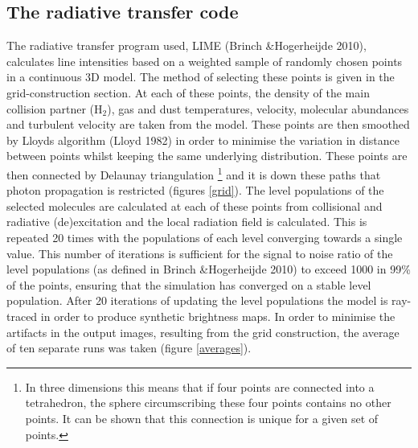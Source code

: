 \documentclass[useAMS,usenatbib]{mn2e}
\begin{document}
\subsection{The radiative transfer code} \label{subsec:radiative_transfer_code}
The radiative transfer program used, LIME (Brinch \&Hogerheijde 2010), calculates line intensities based on a weighted sample of randomly chosen points in a continuous 3D model. The method of selecting these points is given in the grid-construction section. At each of these points, the density of the main collision partner (H$_2$), gas and dust temperatures, velocity, molecular abundances and turbulent velocity are taken from the model. These points are then smoothed by Lloyds algorithm (Lloyd 1982) in order to minimise the variation in distance between points whilst keeping the same underlying distribution. These points are then connected by Delaunay triangulation \footnote{In three dimensions this means that if four points are connected into a tetrahedron, the sphere circumscribing these four points contains no other points. It can be shown that this connection is unique for a given set of points.} and it is down these paths that photon propagation is restricted (figures \ref{grid}). The level populations of the selected molecules are calculated at each of these points from collisional and radiative (de)excitation and the local radiation field is calculated. This is repeated 20 times with the populations of each level converging towards a single value. This number of iterations is sufficient for the signal to noise ratio of the level populations (as defined in Brinch \&Hogerheijde 2010) to exceed 1000 in 99\% of the points, ensuring that the simulation has converged on a stable level population. \newline
After 20 iterations of updating the level populations the model is ray-traced in order to produce synthetic brightness maps. In order to minimise the artifacts in the output images, resulting from the grid construction, the average of ten separate runs was taken (figure \ref{averages}).


\end{document}
